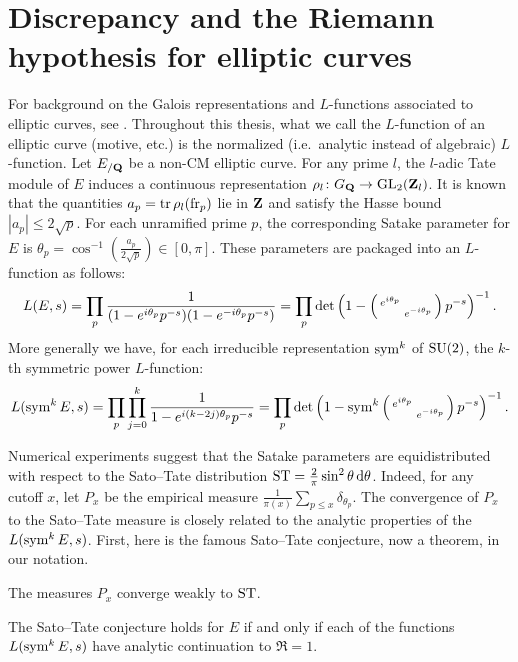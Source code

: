 \section{Discrepancy and the Riemann hypothesis for elliptic curves}

For background on the Galois representations and $L$-functions associated to 
elliptic curves, see \cite[III\S7, C\S17]{silverman-2009}. Throughout this 
thesis, what we call the $L$-function of an elliptic curve (motive, etc.) is 
the normalized (i.e.~analytic instead of algebraic) $L$-function. 
Let $E_{/\mathbf{Q}}$ be a non-CM elliptic curve. For any prime $l$, the $l$-adic Tate 
module of $E$ induces a continuous representation 
$\rho_l \colon G_{\mathbf{Q}} \to \operatorname{GL}_2(\mathbf{Z}_l)$. It is known that the quantities 
$a_p = \operatorname{tr} \rho_l(\mathrm{fr}_p)$ lie in $\mathbf{Z}$ and satisfy the Hasse bound 
$|a_p| \leqslant 2\sqrt p$. For each unramified prime $p$, the 
corresponding Satake parameter for $E$ is 
$\theta_p = \cos^{-1}\left(\frac{a_p}{2\sqrt p}\right) \in [0,\pi]$. 
These parameters are packaged into an $L$-function as follows:
\[
	L(E,s) = \prod_p \frac{1}{(1 - e^{i \theta_p} p^{-s})(1- e^{-i \theta_p} p^{-s})} = \prod_p \det\left(1 - \left(\begin{smallmatrix} e^{i\theta_p} &  \\  & e^{-i \theta_p} \end{smallmatrix}\right)p^{-s}\right)^{-1}.
\]
More generally we have, for each irreducible representation $\operatorname{sym}^k$ of 
$\operatorname{SU}(2)$, the $k$-th symmetric power $L$-function: 
\[
	L(\operatorname{sym}^k E, s) = \prod_p \prod_{j=0}^k \frac{1}{1 - e^{i (k - 2j) \theta_p} p^{-s}} = \prod_p \det\left(1-\operatorname{sym}^k \left(\begin{smallmatrix} e^{i\theta_p} &  \\  & e^{-i \theta_p} \end{smallmatrix}\right)p^{-s}\right)^{-1}.
\]

Numerical experiments suggest that the Satake parameters are equidistributed 
with respect to the Sato--Tate distribution 
$\mathrm{ST} = \frac{2}{\pi} \sin^2\theta\, \mathrm{d}\theta$. Indeed, for any cutoff $x$, let 
$P_x$ be the empirical measure 
$\frac{1}{\pi(x)} \sum_{p\leqslant x} \delta_{\theta_p}$. 
The convergence of $P_x$ to the Sato--Tate measure is closely related to 
the analytic properties of the $L(\operatorname{sym}^k E,s)$. First, here is the famous 
Sato--Tate conjecture, now a theorem, in our notation. 

\begin{theorem}[Taylor et.~al.]
The measures $P_x$ converge weakly to $\mathrm{ST}$. 
\end{theorem}

\begin{theorem}[Serre]
The Sato--Tate conjecture holds for $E$ if and only if each of 
the functions $L(\operatorname{sym}^k E,s)$ have analytic continuation to $\Re = 1$. 
\end{theorem}

